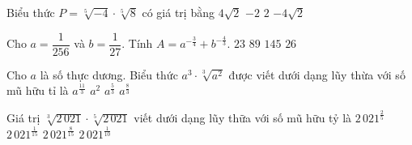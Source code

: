 

\begin{ex}%
	 Biểu thức $P=\sqrt[5]{-4}\cdot\sqrt[5]{8}$ có giá trị bằng
	\choice 
		{$4\sqrt{2}$} 
		 {\True $-2$}
		 {$2$}
		 {$-4\sqrt{2}$}
\end{ex}

\begin{ex}%
	Cho $a=\dfrac{1}{256}$ và $b=\dfrac{1}{27}$.  Tính $A=a^{-\tfrac{3}{4}}+b^{-\tfrac{4}{3}}$.
	\choice 
		{$23$} 
		 {$89$}
		{\True  $145$}
		 {$26$}
\end{ex}

\begin{ex}%
	Cho $a$ là số thực dương. Biểu thức $a^3\cdot \sqrt[3]{a^2}$ được viết dưới dạng lũy thừa với số mũ  hữu tỉ là
	\choice 
		{\True  $a^{\tfrac{11}{3}}$}
		 {$a^2$}
		{$a^{\tfrac{5}{3}}$} 
		{$a^{\tfrac{8}{3}}$} 
\end{ex}

\begin{ex}%
	Giá trị $\sqrt[3]{2\,021}\cdot\sqrt[5]{2\,021}$ viết dưới dạng lũy  thữa với số mũ hữu tỷ là
	\choice 
		 {$2\,021^{\tfrac{2}{5}}$}
		 {$2\,021^{\tfrac{1}{15}}$}
		{\True  $2\,021^{\tfrac{8}{15}}$}
		{$2\,021^{\tfrac{1}{10}}$} 
\end{ex}

